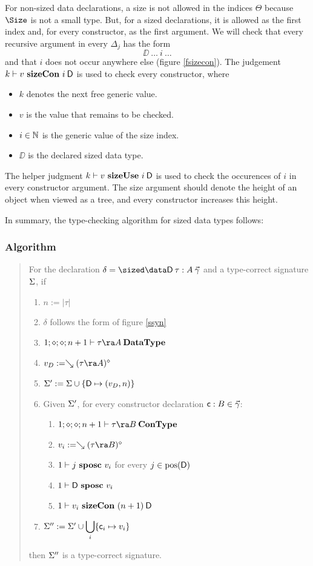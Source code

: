 \noindent For non-sized data declarations, a size is not allowed in the indices $\Theta$ because $\Size$ is not a small type.
But, for a sized declarations, it is allowed as the first index and, for every constructor, as the first argument.
We will check that every recursive argument in every $\Delta_j$ has the form \[\DD \: \ldots \: i \: \ldots \]
and that $i$ does not occur anywhere else (figure \ref{fsizecon}). 
The judgement $k\vdash v\mbox{ \textbf{sizeCon} }i\:\mathsf{D}$ is used to check every constructor, where
\begin{itemize}
\item
$k$ denotes the next free generic value.
\item
$v$ is the value that remains to be checked.
\item
$i \in \mathbb{N} $ is the generic value of the size index.
\item
$\DD$ is the declared sized data type.
\end{itemize}
The helper judgment $k\vdash v\mbox{ \textbf{sizeUse} }i\:\mathsf{D}$ is used to check the occurences of $i$ in every constructor argument.
The size argument should denote the height of an object when viewed as a tree, and every constructor increases this height.

\noindent In summary, the type-checking algorithm for sized data types follows: 
\subsubsection{Algorithm}
\begin{quote}
For the declaration $\delta = \sized \data \DD \: \tau : A \: \vec{\gamma} $ 
and a type-correct signature $\Sigma$, if
\begin{enumerate}
\item
$ n := \vert\tau\vert$
\item
$\delta$ follows the form of figure \ref{ssyn}
\item
$\DataType{1}{\diamond}{\diamond}{n+1}{\tau \ra A}$
\item
$v_D := \wh \clp{\tau \ra A}{\diamond}$
\item
$\Sigma' := \Sigma \cup \{\mathsf{D} \mapsto (v_D,n)\}$
\item
Given $\Sigma'$, for every constructor declaration $\mathsf{c} : B  \in \vec{\gamma}$:
\begin{enumerate} 
\item
$\ConType{1}{\diamond}{\diamond}{n+1}{\tau \ra B}$
\item
$v_i := \wh \clp{\tau \ra B}{\diamond}$
\item
$1\vdash j\mbox{ \textbf{sposc} }v_i$ for every $j \in \mbox{pos}(\mathsf{D}) $ 
\item
$1\vdash\mathsf{D}\mbox{ \textbf{sposc} }v_i$
\item
$1\vdash v_i\mbox{ \textbf{sizeCon} }(n+1)\:\mathsf{D}$
\end{enumerate}
\item
$\Sigma'' := \Sigma' \cup \displaystyle\bigcup_{i}\{\mathsf{c}_i \mapsto v_i\}$
\end{enumerate}
then $\Sigma''$ is a type-correct signature.
\end{quote}

